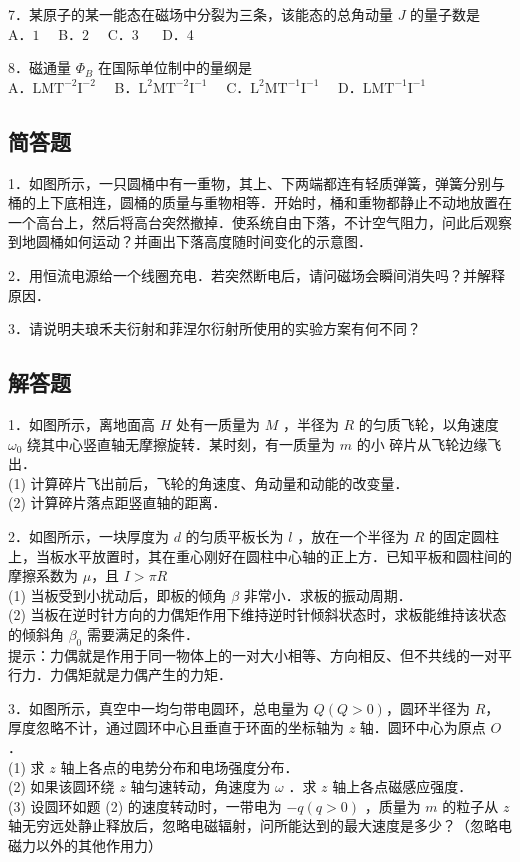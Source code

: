 7．某原子的某一能态在磁场中分裂为三条，该能态的总角动量 $J$ 的量子数是\\
A．$1\quad $ B．$2 \quad$ C．3 $\quad$ D．4

8．磁通量 $\Phi_B$ 在国际单位制中的量纲是\\
A．$\mathrm{LMT^{-2}I^{-2}}\quad$ B．$\mathrm{L^{2}MT^{-2}I^{-1}}\quad$ C．$\mathrm{L^{2}MT^{-1}I^{-1}}\quad$ D．$\mathrm{LMT^{-1}I^{-1}}$

\subsection{简答题}
1．如图所示，一只圆桶中有一重物，其上、下两端都连有轻质弹簧，弹簧分别与桶的上下底相连，圆桶的质量与重物相等．开始时，桶和重物都静止不动地放置在一个高台上，然后将高台突然撤掉．使系统自由下落，不计空气阻力，问此后观察到地圆桶如何运动？并画出下落高度随时间变化的示意图．


2．用恒流电源给一个线圈充电．若突然断电后，请问磁场会瞬间消失吗？并解释原因．


3．请说明夫琅禾夫衍射和菲涅尔衍射所使用的实验方案有何不同？


\subsection{解答题}
1．如图所示，离地面高 $H$ 处有一质量为 $M$ ，半径为 $R$ 的匀质飞轮，以角速度 $\omega_0$ 绕其中心竖直轴无摩擦旋转．某时刻，有一质量为 $m$ 的小 碎片从飞轮边缘飞出．\\
(1) 计算碎片飞出前后，飞轮的角速度、角动量和动能的改变量．\\
(2) 计算碎片落点距竖直轴的距离．

2．如图所示，一块厚度为 $d$ 的匀质平板长为 $l$ ，放在一个半径为 $R$ 的固定圆柱上，当板水平放置时，其在重心刚好在圆柱中心轴的正上方．已知平板和圆柱间的摩擦系数为 $\mu$，且 $I>\pi R$\\
(1) 当板受到小扰动后，即板的倾角 $\beta$ 非常小．求板的振动周期．\\
(2) 当板在逆时针方向的力偶矩作用下维持逆时针倾斜状态时，求板能维持该状态的倾斜角 $\beta_0$ 需要满足的条件．\\
提示：力偶就是作用于同一物体上的一对大小相等、方向相反、但不共线的一对平行力．力偶矩就是力偶产生的力矩．


3．如图所示，真空中一均匀带电圆环，总电量为 $Q(Q>0)$，圆环半径为 $R$，厚度忽略不计，通过圆环中心且垂直于环面的坐标轴为 $z$ 轴．圆环中心为原点 $O$．\\
(1) 求 $z$ 轴上各点的电势分布和电场强度分布．\\
(2) 如果该圆环绕 $z$ 轴匀速转动，角速度为 $\omega$ ．求 $z$ 轴上各点磁感应强度．\\
(3) 设圆环如题 (2) 的速度转动时，一带电为 $-q(q>0)$ ，质量为 $m$ 的粒子从 $z$ 轴无穷远处静止释放后，忽略电磁辐射，问所能达到的最大速度是多少？（忽略电磁力以外的其他作用力）


